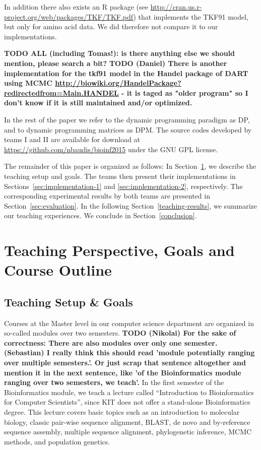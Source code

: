 \documentclass[runningheads,a4paper]{llncs}
\begin{document}
In addition there also exists an R package (see \url{http://cran.us.r-project.org/web/packages/TKF/TKF.pdf}) that implements the TKF91 model, but only for amino acid data.
We did therefore not compare it to our implementations.

{\bf TODO ALL (including Tomas!): is there anything else we should mention, please search a bit?}
{\bf TODO (Daniel) There is another implementation for the tkf91 model in the Handel package of DART using MCMC \url{http://biowiki.org/HandelPackage?redirectedfrom=Main.HANDEL} - it is taged as "older program" so I don't know if it is still maintained and/or optimized.}

In the rest of the paper we refer to the dynamic programming paradigm as DP, and to dynamic programming matrices as DPM.
The source codes developed by teams I and II are available for download at \url{https://github.com/nbaudis/bioinf2015} under the GNU GPL license.

The remainder of this paper is organized as follows: In Section~\ref{teaching}, we describe the teaching setup and goals.
The teams then present their implementations in Sections~\ref{sec:implementation-1} and \ref{sec:implementation-2}, respectively.
The corresponding experimental results by both teams are presented in Section~\ref{sec:evaluation}.
In the following Section~\ref{teaching-results}, we summarize our teaching experiences.
We conclude in Section~\ref{conclusion}.

\section{Teaching Perspective, Goals and Course Outline}
\label{teaching}

\subsection{Teaching Setup \& Goals}
\label{setup}

Courses at the Master level in our computer science department are organized in so-called modules over two semesters.
\textbf{TODO (Nikolai) For the sake of correctness: There are also modules over
only one semester. (Sebastian) I really think this should read 'module potentially ranging over multiple semesters.'.
Or just scrap that sentence altogether and mention it in the next sentence, like 'of the Bioinformatics module ranging over two semesters, we teach'.}
In the first semester of the Bioinformatics module, we teach a lecture called ``Introduction to Bioinformatics for Computer Scientists'', since KIT does not offer
a stand-alone Bioinformatics degree. This lecture covers basic topics such as an introduction to molecular biology, classic pair-wise sequence alignment,
BLAST, de novo and by-reference sequence assembly, multiple sequence alignment, phylogenetic inference, MCMC methods, and population genetics.
\end{document}
